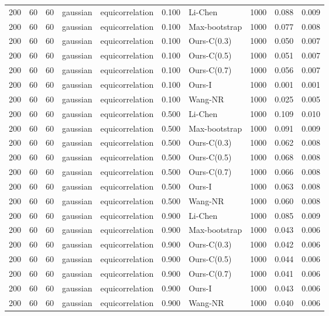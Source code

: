 \begin{tabular}{rrrllrlrrr}
200 & 60 & 60 & gaussian & equicorrelation & 0.100 & Li-Chen & 1000 & 0.088 & 0.009 \\
200 & 60 & 60 & gaussian & equicorrelation & 0.100 & Max-bootstrap & 1000 & 0.077 & 0.008 \\
200 & 60 & 60 & gaussian & equicorrelation & 0.100 & Ours-C(0.3) & 1000 & 0.050 & 0.007 \\
200 & 60 & 60 & gaussian & equicorrelation & 0.100 & Ours-C(0.5) & 1000 & 0.051 & 0.007 \\
200 & 60 & 60 & gaussian & equicorrelation & 0.100 & Ours-C(0.7) & 1000 & 0.056 & 0.007 \\
200 & 60 & 60 & gaussian & equicorrelation & 0.100 & Ours-I & 1000 & 0.001 & 0.001 \\
200 & 60 & 60 & gaussian & equicorrelation & 0.100 & Wang-NR & 1000 & 0.025 & 0.005 \\
200 & 60 & 60 & gaussian & equicorrelation & 0.500 & Li-Chen & 1000 & 0.109 & 0.010 \\
200 & 60 & 60 & gaussian & equicorrelation & 0.500 & Max-bootstrap & 1000 & 0.091 & 0.009 \\
200 & 60 & 60 & gaussian & equicorrelation & 0.500 & Ours-C(0.3) & 1000 & 0.062 & 0.008 \\
200 & 60 & 60 & gaussian & equicorrelation & 0.500 & Ours-C(0.5) & 1000 & 0.068 & 0.008 \\
200 & 60 & 60 & gaussian & equicorrelation & 0.500 & Ours-C(0.7) & 1000 & 0.066 & 0.008 \\
200 & 60 & 60 & gaussian & equicorrelation & 0.500 & Ours-I & 1000 & 0.063 & 0.008 \\
200 & 60 & 60 & gaussian & equicorrelation & 0.500 & Wang-NR & 1000 & 0.060 & 0.008 \\
200 & 60 & 60 & gaussian & equicorrelation & 0.900 & Li-Chen & 1000 & 0.085 & 0.009 \\
200 & 60 & 60 & gaussian & equicorrelation & 0.900 & Max-bootstrap & 1000 & 0.043 & 0.006 \\
200 & 60 & 60 & gaussian & equicorrelation & 0.900 & Ours-C(0.3) & 1000 & 0.042 & 0.006 \\
200 & 60 & 60 & gaussian & equicorrelation & 0.900 & Ours-C(0.5) & 1000 & 0.044 & 0.006 \\
200 & 60 & 60 & gaussian & equicorrelation & 0.900 & Ours-C(0.7) & 1000 & 0.041 & 0.006 \\
200 & 60 & 60 & gaussian & equicorrelation & 0.900 & Ours-I & 1000 & 0.043 & 0.006 \\
200 & 60 & 60 & gaussian & equicorrelation & 0.900 & Wang-NR & 1000 & 0.040 & 0.006 \\

\end{tabular}
